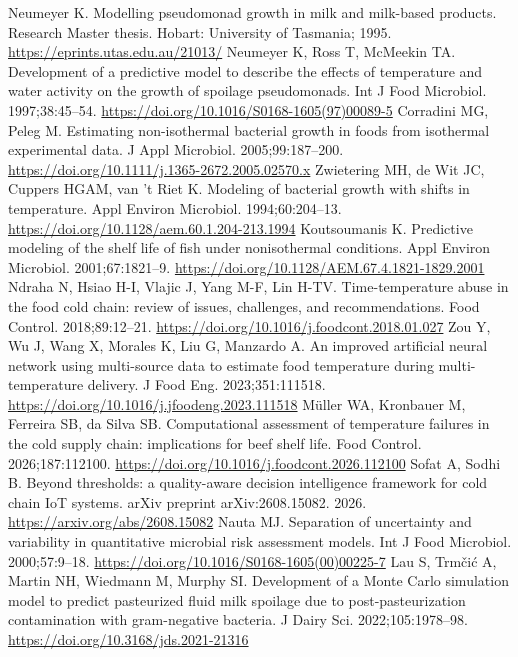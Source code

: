  Neumeyer K. Modelling pseudomonad growth in milk and milk-based products. Research Master thesis. Hobart: University of Tasmania; 1995. \url{https://eprints.utas.edu.au/21013/}
 Neumeyer K, Ross T, McMeekin TA. Development of a predictive model to describe the effects of temperature and water activity on the growth of spoilage pseudomonads. Int J Food Microbiol. 1997;38:45--54. \url{https://doi.org/10.1016/S0168-1605(97)00089-5}
 Corradini MG, Peleg M. Estimating non-isothermal bacterial growth in foods from isothermal experimental data. J Appl Microbiol. 2005;99:187--200. \url{https://doi.org/10.1111/j.1365-2672.2005.02570.x}
 Zwietering MH, de Wit JC, Cuppers HGAM, van 't Riet K. Modeling of bacterial growth with shifts in temperature. Appl Environ Microbiol. 1994;60:204--13. \url{https://doi.org/10.1128/aem.60.1.204-213.1994}
 Koutsoumanis K. Predictive modeling of the shelf life of fish under nonisothermal conditions. Appl Environ Microbiol. 2001;67:1821--9. \url{https://doi.org/10.1128/AEM.67.4.1821-1829.2001}
 Ndraha N, Hsiao H-I, Vlajic J, Yang M-F, Lin H-TV. Time-temperature abuse in the food cold chain: review of issues, challenges, and recommendations. Food Control. 2018;89:12--21. \url{https://doi.org/10.1016/j.foodcont.2018.01.027}
 Zou Y, Wu J, Wang X, Morales K, Liu G, Manzardo A. An improved artificial neural network using multi-source data to estimate food temperature during multi-temperature delivery. J Food Eng. 2023;351:111518. \url{https://doi.org/10.1016/j.jfoodeng.2023.111518}
 Müller WA, Kronbauer M, Ferreira SB, da Silva SB. Computational assessment of temperature failures in the cold supply chain: implications for beef shelf life. Food Control. 2026;187:112100. \url{https://doi.org/10.1016/j.foodcont.2026.112100}
 Sofat A, Sodhi B. Beyond thresholds: a quality-aware decision intelligence framework for cold chain IoT systems. arXiv preprint arXiv:2608.15082. 2026. \url{https://arxiv.org/abs/2608.15082}
 Nauta MJ. Separation of uncertainty and variability in quantitative microbial risk assessment models. Int J Food Microbiol. 2000;57:9--18. \url{https://doi.org/10.1016/S0168-1605(00)00225-7}
 Lau S, Trmčić A, Martin NH, Wiedmann M, Murphy SI. Development of a Monte Carlo simulation model to predict pasteurized fluid milk spoilage due to post-pasteurization contamination with gram-negative bacteria. J Dairy Sci. 2022;105:1978--98. \url{https://doi.org/10.3168/jds.2021-21316}
